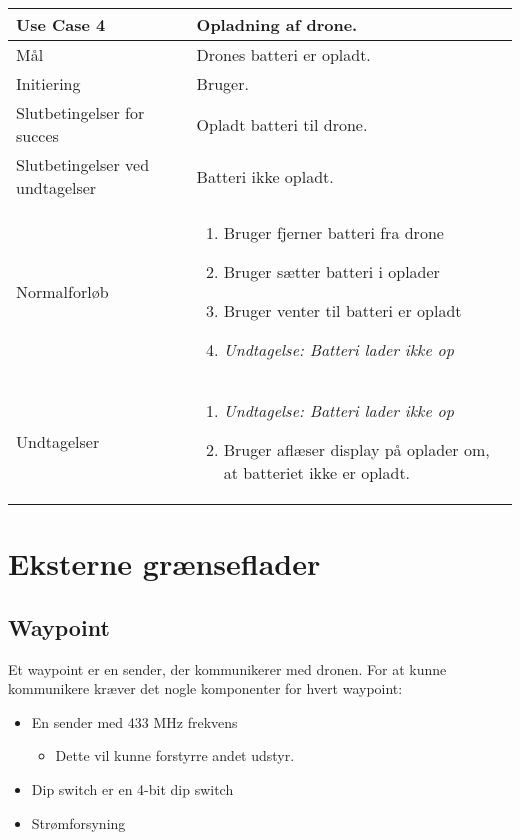 \documentclass[Main]{subfiles}
\begin{document}
\begin{longtable}{|p{}|p{}|}
\hline
Use Case 4 	& 
Opladning af drone. \\ \hline

Mål 		& 
Drones batteri er opladt. \\ \hline

Initiering	& 
Bruger. \\ \hline

Slutbetingelser for succes & 
Opladt batteri til drone.  \\ \hline

Slutbetingelser ved undtagelser & 
Batteri ikke opladt. \\ \hline

Normalforløb &	\vspace{-8mm}
	\begin{enumerate}
	\item Bruger fjerner batteri fra drone
	\item Bruger sætter batteri i oplader
	\item Bruger venter til batteri er opladt
	\item[]	\textit{Undtagelse: Batteri lader ikke op}
	\end{enumerate} \\ \hline

Undtagelser & \vspace{-8mm}
	\begin{enumerate}
	\item[] \textit{Undtagelse: Batteri lader ikke op}
	\item Bruger aflæser display på oplader om, at batteriet ikke er opladt.
	\end{enumerate} \\

\hline
\end{longtable}

	
\section{Eksterne grænseflader}

\subsection{Waypoint}
Et waypoint er en sender, der kommunikerer med dronen.
For at kunne kommunikere kræver det nogle komponenter for hvert waypoint:

	\begin{itemize}
	\item En sender med 433 MHz frekvens
	
		\begin{itemize}
		\item Dette vil kunne forstyrre andet udstyr.
		\end{itemize}
	
	\item Dip switch er en 4-bit dip switch
	
	\item Strømforsyning 
	\end{itemize}
	
\end{document}
